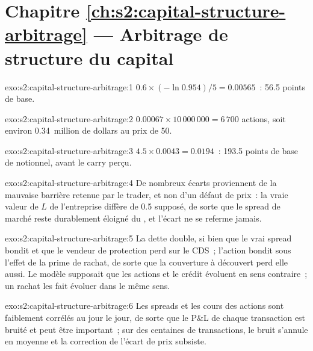 \section*{Chapitre \ref{ch:s2:capital-structure-arbitrage} --- Arbitrage de structure du capital}

\begin{solution}{exo:s2:capital-structure-arbitrage:1}
$0.6 \times (-\ln 0.954)/5 = 0.00565$~: 56.5 points de base.
\end{solution}

\begin{solution}{exo:s2:capital-structure-arbitrage:2}
$0.00067 \times 10\,000\,000 = 6\,700$ actions, soit environ 0.34~million de dollars au prix de 50.
\end{solution}

\begin{solution}{exo:s2:capital-structure-arbitrage:3}
$4.5 \times 0.0043 = 0.0194$~: 193.5 points de base de notionnel, avant le carry perçu.
\end{solution}

\begin{solution}{exo:s2:capital-structure-arbitrage:4}
De nombreux écarts proviennent de la mauvaise barrière retenue par le trader, et non d'un défaut de prix~: la vraie valeur de $L$ de l'entreprise diffère de 0.5 supposé, de sorte que le spread de marché reste
durablement éloigné du , et l'écart ne se referme jamais.
\end{solution}

\begin{solution}{exo:s2:capital-structure-arbitrage:5}
La dette double, si bien que le vrai spread bondit et que le vendeur de protection perd sur le CDS~; l'action bondit sous l'effet de la prime de rachat, de sorte que la couverture à découvert
perd elle aussi. Le modèle supposait que les actions et le crédit évoluent en sens contraire~; un rachat les fait évoluer dans le même sens.
\end{solution}

\begin{solution}{exo:s2:capital-structure-arbitrage:6}
Les spreads et les cours des actions sont faiblement corrélés au jour le jour, de sorte que le P\&L de chaque transaction est bruité et peut être important~; sur des centaines de transactions, le bruit
s'annule en moyenne et la correction de l'écart de prix subsiste.
\end{solution}

